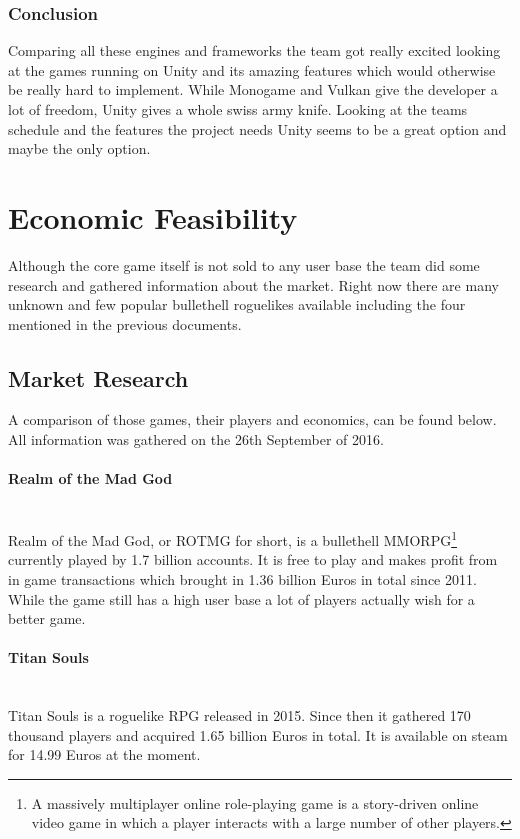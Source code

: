 \documentclass[11pt]{article}
\begin{document}
\subsubsection{Conclusion}
Comparing all these engines and frameworks the team got really excited looking at the games running on Unity and its amazing features which would otherwise be really hard to implement. 
While Monogame and Vulkan give the developer a lot of freedom, Unity gives a whole swiss army knife. Looking at the teams schedule and the features the project needs Unity seems to be a great option and maybe the only option.

\section{Economic Feasibility}
Although the core game itself is not sold to any user base the team did some research and gathered information about the market.
Right now there are many unknown and few popular bullethell roguelikes available including the four mentioned in the previous documents.

\subsection{Market Research}
A comparison of those games, their players and economics, can be found below. All information was gathered on the 26th September of 2016.

\paragraph{Realm of the Mad God}~\\
Realm of the Mad God, or ROTMG for short, is a bullethell MMORPG\footnote{A massively multiplayer online role-playing game is a story-driven online video game in which a player interacts with a large number of other players.} currently played by 1.7 billion accounts.
It is free to play and makes profit from in game transactions which brought in 1.36 billion Euros in total since 2011.\\
While the game still has a high user base a lot of players actually wish for a better game.

\paragraph{Titan Souls}~\\
Titan Souls is a roguelike RPG released in 2015. Since then it gathered 170 thousand players and acquired 1.65 billion Euros in total. It is available on steam for 14.99 Euros at the moment.
\end{document}
